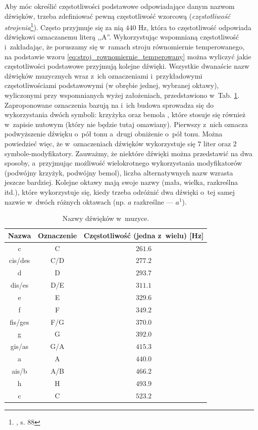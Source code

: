 Aby móc określić częstotliwości podstawowe odpowiadające danym nazwom dźwięków, trzeba zdefiniować pewną częstotliwość wzorcową (\emph{częstotliwość strojenia}\footnote{\cite{lerch_introduction_2012}, s. 88}). Często przyjmuje się za nią $440$ Hz, która to częstotliwość odpowiada dźwiękowi oznaczanemu literą ,,A''. Wykorzystując wspomnianą częstotliwość i~zakładając, że poruszamy się w~ramach stroju równomiernie temperowanego, na podstawie wzoru \ref{eq:stroj_rownomiernie_temperowany} można wyliczyć jakie częstotliwości podstawowe przyjmują kolejne dźwięki. Wszystkie dwanaście nazw dźwięków muzycznych wraz z~ich oznaczeniami i~przykładowymi częstotliwościami podstawowymi (w obrębie jednej, wybranej oktawy), wyliczonymi przy wspomnianych wyżej założeniach, przedstawiono w~Tab. \ref{tab:nazwy_dzwiekow}. Zaproponowane oznaczenia bazują na \cite{lerch_introduction_2012} i~ich budowa sprowadza się do wykorzystania dwóch symboli: krzyżyka \musSharp{} oraz bemola \musFlat{}, które stosuje się również w~zapisie nutowym (który nie będzie tutaj omawiany). Pierwszy z~nich oznacza podwyższenie dźwięku o~pół tonu a~drugi obniżenie o~pół tonu. Można powiedzieć więc, że w~oznaczeniach dźwięków wykorzystuje się $7$ liter oraz $2$ symbole-modyfikatory. Zauważmy, że niektóre dźwięki można przedstawić na dwa sposoby, a~przyjmując możliwość wielokrotnego wykorzystania modyfikatorów (podwójny krzyżyk, podwójny bemol), liczba alternatywnych nazw wzrasta jeszcze bardziej. Kolejne oktawy mają swoje nazwy (mała, wielka, razkreślna itd.), które wykorzystuje się, kiedy trzeba odróżnić dwa dźwięki o~tej samej nazwie w~dwóch różnych oktawach (np. $a$ razkreślne --- $a^1$).

\begin{table}[htb]
    \centering
    \caption{Nazwy dźwięków w~muzyce.}
    \label{tab:nazwy_dzwiekow}
    \begin{tabular}{|c|c|c|} \hline
        Nazwa & Oznaczenie & Częstotliwość (jedna z~wielu) [Hz] \\ \hline
        c       & C     & $261.6$  \\
        cis/des & C\sh{}/D\fl{} & $277.2$  \\
        d       & D     & $293.7$  \\
        dis/es  & D\sh{}/E\fl{} & $311.1$  \\
        e       & E     & $329.6$  \\
        f       & F     & $349.2$  \\
        fis/ges & F\sh{}/G\fl{} & $370.0$  \\
        g       & G     & $392.0$  \\
        gis/as  & G\sh{}/A\fl{} & $415.3$  \\
        a       & A     & $440.0$  \\
        ais/b   & A\sh{}/B  & $466.2$  \\
        h       & H     & $493.9$  \\
        c       & C     & $523.2$  \\ \hline
    \end{tabular}
\end{table}

